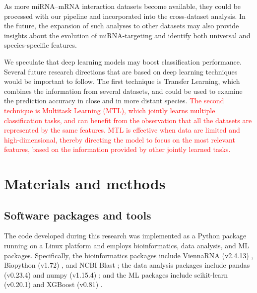 \documentclass{bmcart}
\begin{document}
As more miRNA--mRNA interaction datasets become available, they could be processed with our pipeline and incorporated into the cross-dataset analysis. In the future, the expansion of such analyses to other datasets may also provide insights about the evolution of miRNA-targeting and identify both universal and species-specific features. 

We speculate that deep learning models may boost classification performance. Several future research directions that are based on deep learning techniques would be important to follow. The first technique is Transfer Learning, which combines the information from several datasets, and could be used to examine the prediction accuracy in close and in more distant species. \textcolor{red}{The second technique is Multitask Learning (MTL), which jointly learns multiple classification tasks, and can benefit from the observation that all the datasets are represented by the same features. MTL is effective when data are limited and high-dimensional, thereby directing the model to focus on the most relevant features, based on the information provided by other jointly learned tasks.}





\clearpage
\section*{Materials and methods}
\subsection*{Software packages and tools}
The code developed during this research was implemented as a Python package running on a Linux platform and employs bioinformatics, data analysis, and ML packages. Specifically, the bioinformatics packages include ViennaRNA (v2.4.13) \cite{lorenz2011viennarna}, Biopython (v1.72) \cite{cock2009biopython}, and NCBI Blast \cite{altschul1990basic_blast}; the data analysis packages include pandas (v0.23.4) \cite{mckinney2010data_pandas} and numpy (v1.15.4) \cite{oliphant2006guide_numpy}; and the ML packages include scikit-learn (v0.20.1) \cite{pedregosa2011scikit} and XGBoost (v0.81) \cite{xgboost}.
\end{document}
